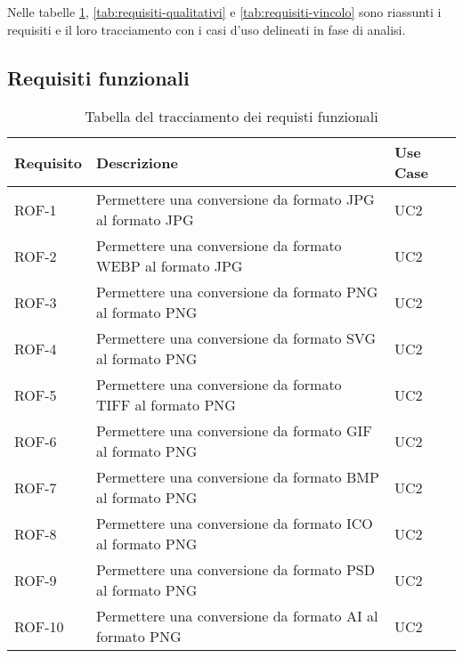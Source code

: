 Nelle tabelle \ref{tab:requisiti-funzionali}, \ref{tab:requisiti-qualitativi} e
\ref{tab:requisiti-vincolo} sono riassunti i requisiti e il loro tracciamento
con i casi d'uso delineati in fase di analisi.

\newpage

\subsection{Requisiti funzionali}
\begin{table}[H]
    \caption{Tabella del tracciamento dei requisti funzionali}
    \label{tab:requisiti-funzionali}
    \begin{tabularx}{\textwidth}{lXl}
        \hline\hline
        \textbf{Requisito} & \textbf{Descrizione}                                               & \textbf{Use Case} \\
        \hline
        ROF-1              & Permettere una conversione da formato JPG al
        formato JPG        & UC2
        \\
        \hline
        ROF-2              & Permettere una conversione da formato WEBP al formato JPG          & UC2
        \\
        \hline
        ROF-3              & Permettere una conversione da formato PNG al formato PNG           & UC2
        \\
        \hline
        ROF-4              & Permettere una conversione da formato SVG al formato PNG           & UC2
        \\
        \hline
        ROF-5              & Permettere una conversione da formato TIFF al formato PNG          & UC2
        \\
        \hline
        ROF-6              & Permettere una conversione da formato GIF al formato PNG           & UC2
        \\
        \hline
        ROF-7              & Permettere una conversione da formato BMP al formato PNG           & UC2
        \\
        \hline
        ROF-8              & Permettere una conversione da formato ICO al formato PNG           & UC2
        \\
        \hline
        ROF-9              & Permettere una conversione da formato PSD al formato PNG           & UC2
        \\
        \hline
        ROF-10             & Permettere una conversione da formato AI al formato PNG            & UC2
        \\
        \hline

\end{tabularx}
\end{table}

